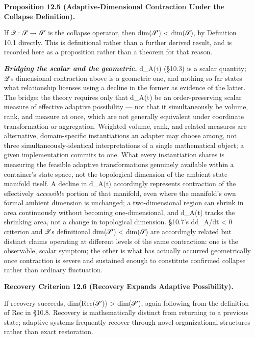 \documentclass[
]{article}
\begin{document}
\textbf{Proposition 12.5 (Adaptive-Dimensional Contraction Under the
Collapse Definition).}

If 𝒬 : 𝒮 → 𝒮′ is the collapse operator, then dim(𝒮′) \textless{} dim(𝒮),
by Definition 10.1 directly. This is definitional rather than a further
derived result, and is recorded here as a proposition rather than a
theorem for that reason.

\emph{\textbf{Bridging the scalar and the geometric.}} d\_A(t) (§10.3)
is a scalar quantity; 𝒬's dimensional contraction above is a geometric
one, and nothing so far states what relationship licenses using a
decline in the former as evidence of the latter. The bridge: the theory
requires only that d\_A(t) be an order-preserving scalar measure of
effective adaptive possibility --- not that it simultaneously be volume,
rank, and measure at once, which are not generally equivalent under
coordinate transformation or aggregation. Weighted volume, rank, and
related measures are alternative, domain-specific instantiations an
adapter may choose among, not three simultaneously-identical
interpretations of a single mathematical object; a given implementation
commits to one. What every instantiation shares is measuring the
feasible adaptive transformations genuinely available within a
container's state space, not the topological dimension of the ambient
state manifold itself. A decline in d\_A(t) accordingly represents
contraction of the effectively \emph{accessible} portion of that
manifold, even where the manifold's own formal ambient dimension is
unchanged; a two-dimensional region can shrink in area continuously
without becoming one-dimensional, and d\_A(t) tracks the shrinking area,
not a change in topological dimension. §10.7's dd\_A/dt \textless{} 0
criterion and 𝒬's definitional dim(𝒮′) \textless{} dim(𝒮) are
accordingly related but distinct claims operating at different levels of
the same contraction: one is the observable, scalar symptom; the other
is what has actually occurred geometrically once contraction is severe
and sustained enough to constitute confirmed collapse rather than
ordinary fluctuation.

\textbf{Recovery Criterion 12.6 (Recovery Expands Adaptive
Possibility).}

If recovery succeeds, dim(Rec(𝒮′)) \textgreater{} dim(𝒮′), again
following from the definition of Rec in §10.8. Recovery is
mathematically distinct from returning to a previous state; adaptive
systems frequently recover through novel organizational structures
rather than exact restoration.
\end{document}
